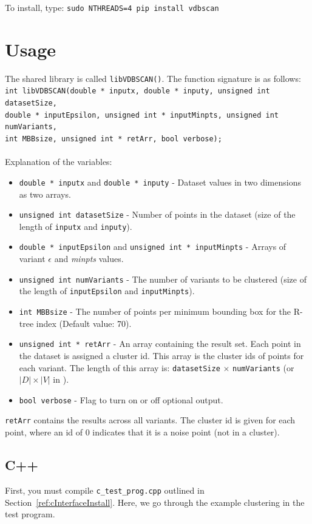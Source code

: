 \documentclass[12pt]{article}
\def\eps{$\epsilon$\xspace}
\def\minpts{\emph{minpts}\xspace}
\begin{document}
\noindent To install, type: \verb|sudo NTHREADS=4 pip install vdbscan|


\section{Usage}\label{sec:sharedliboverview}
The shared library is called \verb|libVDBSCAN()|. The function signature is as follows:\\
\texttt{int libVDBSCAN(double * inputx, double * inputy, unsigned int datasetSize, \\double * inputEpsilon, unsigned int * inputMinpts, unsigned int numVariants,\\ int MBBsize, unsigned int * retArr, bool verbose);}\\
\\Explanation of the variables:

\begin{itemize}
\item \texttt{double * inputx} and \texttt{double * inputy} - Dataset values in two dimensions as two arrays.
\item \texttt{unsigned int datasetSize} - Number of points in the dataset (size of the length of \texttt{inputx} and \texttt{inputy}).
\item \texttt{double * inputEpsilon} and \texttt{unsigned int * inputMinpts} - Arrays of variant \eps and \minpts values.
\item \texttt{unsigned int numVariants} - The number of variants to be clustered (size of the length of \texttt{inputEpsilon} and \texttt{inputMinpts}).
\item \texttt{int MBBsize} - The number of points per minimum bounding box for the R-tree index (Default value: 70).
\item \texttt{unsigned int * retArr} - An array containing the result set.  Each point in the dataset is assigned a cluster id. This array is the cluster ids of points for each variant. The length of this array is:  \texttt{datasetSize} $\times$ \texttt{numVariants} (or $|D|\times|V|$ in \cite{Gowanlock2016}).
\item \texttt{bool verbose} - Flag to turn on or off optional output.
\end{itemize}


\texttt{retArr} contains the results across all variants. The cluster id is given for each point, where an id of 0 indicates that it is a noise point (not in a cluster).


\subsection{C++}
First, you must compile \verb|c_test_prog.cpp| outlined in Section~\ref{ref:cInterfaceInstall}. Here, we go through the example clustering in the test program. 
\end{document}
